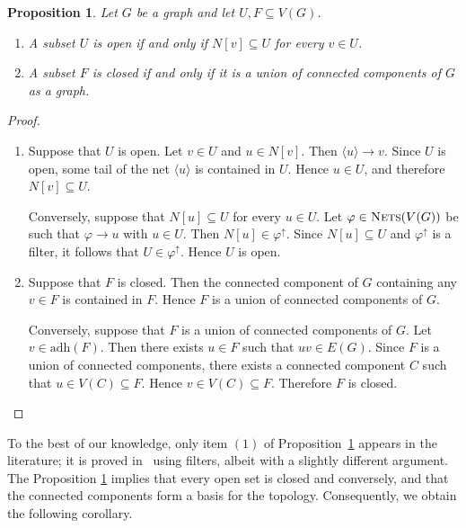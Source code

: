 \documentclass{amsart}
\newtheorem{proposition}{Proposition}[section]
\theoremstyle{definition}
\theoremstyle{remark}
\numberwithin{equation}{section}
\begin{document}
\begin{proposition}
	\label{clopen}
	Let $G$ be a graph and let $U,F\subseteq V(G)$.
	
	\begin{enumerate}
		\item A subset $U$ is open if and only if $N[v]\subseteq U$ for every $v\in U$.
		
		\item A subset $F$ is closed if and only if it is a union of connected components of $G$ as a graph.
	\end{enumerate}
\end{proposition}
\begin{proof}
	\text{}
	\begin{enumerate}
		\item Suppose that $U$ is open. Let $v\in U$ and $u\in N[v]$. Then $\langle u\rangle \to v$. Since $U$ is open, some tail of the net $\langle u\rangle$ is contained in $U$. Hence $u\in U$, and therefore $N[v]\subseteq U$.
		
		Conversely, suppose that $N[u]\subseteq U$ for every $u\in U$. Let $\varphi\in\textsc{Nets}(V(G))$ be such that $\varphi \to u$ with $u\in U$. Then $N[u]\in\varphi^{\uparrow}$. Since $N[u]\subseteq U$ and $\varphi^{\uparrow}$ is a filter, it follows that $U\in\varphi^{\uparrow}$. Hence $U$ is open.
		
		\item Suppose that $F$ is closed. Then the connected component of $G$ containing any $v\in F$ is contained in $F$. Hence $F$ is a union of connected components of $G$.
		
		Conversely, suppose that $F$ is a union of connected components of $G$. Let $v\in \mathrm{adh}(F)$. Then there exists $u\in F$ such that $uv\in E(G)$. Since $F$ is a union of connected components, there exists a connected component $C$ such that $u\in V(C)\subseteq F$. Hence $v\in V(C)\subseteq F$. Therefore $F$ is closed.
	\end{enumerate}
\end{proof}

To the best of our knowledge, only item $(1)$ of Proposition~\ref{clopen} appears in the literature; it is proved in~\cite{probconv} using filters, albeit with a slightly different argument. The Proposition \ref{clopen} implies that every open set is closed and conversely, and that the connected components form a basis for the topology. Consequently, we obtain the following corollary.
\end{document}
